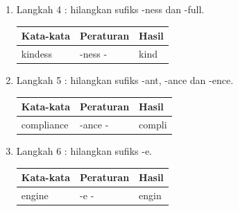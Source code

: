 \begin{enumerate}
    \item Langkah 4 : hilangkan sufiks -ness dan -full.
\begin{table}[]
\centering
\begin{tabular}{|l|l|l|}
\hline
Kata-kata & Peraturan          & Hasil  \\ \hline
kindess  & -ness - & kind \\ \hline
\end{tabular}
\end{table}

    \item Langkah 5 : hilangkan sufiks -ant, -ance dan -ence.
\begin{table}[]
\centering
\begin{tabular}{|l|l|l|}
\hline
Kata-kata & Peraturan          & Hasil  \\ \hline
compliance  & -ance - & compli \\ \hline
\end{tabular}
\end{table}

    \item Langkah 6 : hilangkan sufiks -e.
\begin{table}[]
\centering
\begin{tabular}{|l|l|l|}
\hline
Kata-kata & Peraturan          & Hasil  \\ \hline
engine  & -e - & engin \\ \hline
\end{tabular}
\end{table}

\end{enumerate}


